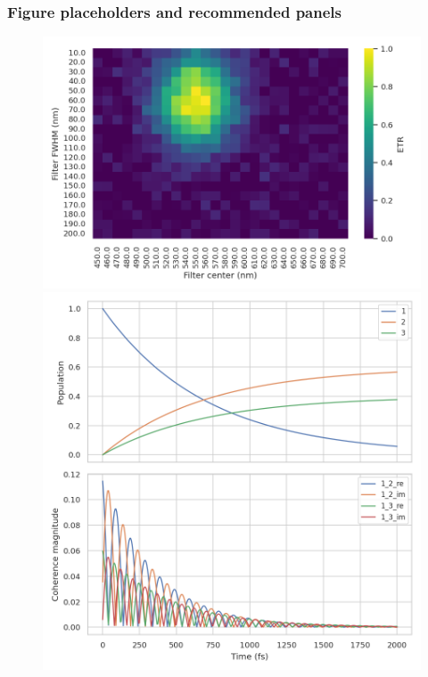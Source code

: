 \documentclass[aps,prb,onecolumn,superscriptaddress,notitlepage,nofootinbib,longbibliography,10pt]{revtex4-2}
\begin{document}
\subsubsection*{Figure placeholders and recommended panels}
\begin{figure}[h]
\centering
\begin{minipage}{0.49\textwidth}
    \centering
    \includegraphics[width=\textwidth]{figures/heatmap_etr.png}
\end{minipage}\hfill
\begin{minipage}{0.49\textwidth}
    \centering
    \includegraphics[width=\textwidth]{figures/traces.png}
\end{minipage}


\end{figure}
\end{document}
